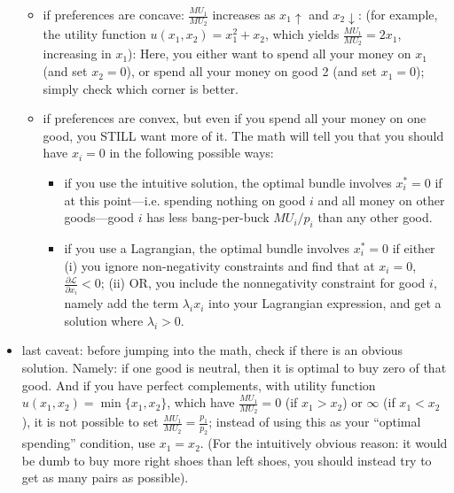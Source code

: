 \documentclass[8pt,landscape]{extarticle}
\begin{document}
\begin{multicols}{4}
\begin{itemize}[leftmargin=*,noitemsep,topsep=0pt]
\begin{itemize}[leftmargin=*,noitemsep,topsep=0pt]
\item if preferences are concave: $\frac{MU_1}{MU_2}$ increases as $x_1 \uparrow$ and $x_2 \downarrow$: (for example, the utility function $u(x_1,x_2) = x_1^2 + x_2$, which yields $\frac{MU_1}{MU_2} = 2x_1$, increasing in $x_1$): Here, you either want to spend all your money on $x_1$ (and set $x_2 = 0$), or spend all your money on good 2 (and set $x_1 = 0$); simply check which corner is better.
\item if preferences are convex, but even if you spend all your money on one good, you STILL want more of it. The math will tell you that you should have $x_i = 0$ in the following possible ways:
\begin{itemize}[leftmargin=*,noitemsep,topsep=0pt]
\item if you use the intuitive solution, the optimal bundle involves $x_i^* = 0$ if at this point---i.e. spending nothing on good $i$ and all money on other goods---good $i$ has less bang-per-buck $MU_i/p_i$ than any other good.
\item if you use a Lagrangian, the optimal bundle involves $x_i^* = 0$ if either (i) you ignore non-negativity constraints and find that at $x_i = 0$, $\frac{\partial \mathcal{L}}{\partial x_i} < 0$; (ii) OR, you include the nonnegativity constraint for good $i$, namely add the term $\lambda_i x_i$ into your Lagrangian expression, and get a solution where $\lambda_i > 0$.
\end{itemize}
\end{itemize}
\item last caveat: before jumping into the math, check if there is an obvious solution. Namely: if one good is neutral, then it is optimal to buy zero of that good. And if you have perfect complements, with utility function $u(x_1,x_2) = \min\{x_1,x_2\}$, which have $\frac{MU_1}{MU_2} = 0$ (if $x_1 > x_2$) or $\infty$ (if $x_1 < x_2$), it is not possible to set $\frac{MU_1}{MU_2} = \frac{p_1}{p_2}$; instead of using this as your ``optimal spending'' condition, use $x_1 = x_2$. (For the intuitively obvious reason: it would be dumb to buy more right shoes than left shoes, you should instead try to get as many pairs as possible).
\end{itemize}


\end{multicols}
\end{document}
